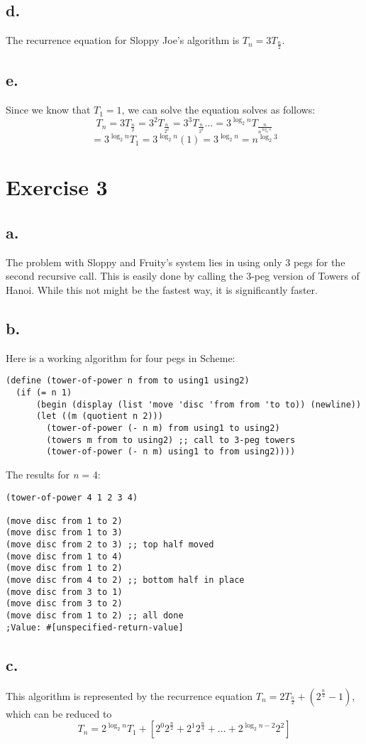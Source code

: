\documentclass[12pt]{article}
\begin{document}
\subsection*{d.}
The recurrence equation for Sloppy Joe's algorithm is $T_n = 3T_\frac{n}{2}.$
\subsection*{e.}
Since we know that $T_1 = 1$, we can solve the equation solves as follows:
$$
T_n = 3T_\frac{n}{2} = 3^2  T_\frac{n}{2^2} = 3^3  T_\frac{n}{2^3}
\ldots = 3^{\log_2 n}T_\frac{n}{n^{\log_2 n}}
$$
$$
 = 3^{\log_2 n}T_1 = 3^{\log_2 n}{(1)} =
3^{\log_2 n} = n^{\log_2 3}
$$
\section*{Exercise 3}
\subsection*{a.}
The problem with Sloppy and Fruity's system lies in using only 3 pegs for the second recursive call.
This is easily done by calling the 3-peg version of Towers of Hanoi. While this not might be the fastest
way, it is significantly faster.
\subsection*{b.}
Here is a working algorithm for four pegs in Scheme:
\begin{verbatim}
(define (tower-of-power n from to using1 using2)
  (if (= n 1)
      (begin (display (list 'move 'disc 'from from 'to to)) (newline))
      (let ((m (quotient n 2)))
        (tower-of-power (- n m) from using1 to using2)
        (towers m from to using2) ;; call to 3-peg towers
        (tower-of-power (- n m) using1 to from using2))))
\end{verbatim}
The results for \emph{n} = 4:
\begin{verbatim}
(tower-of-power 4 1 2 3 4)

(move disc from 1 to 2)
(move disc from 1 to 3)
(move disc from 2 to 3) ;; top half moved
(move disc from 1 to 4)
(move disc from 1 to 2)
(move disc from 4 to 2) ;; bottom half in place
(move disc from 3 to 1)
(move disc from 3 to 2)
(move disc from 1 to 2) ;; all done
;Value: #[unspecified-return-value]
\end{verbatim}

\subsection*{c.}
This algorithm is represented by the recurrence equation $T_n = 2T_\frac{n}{2} + (2^{\frac{n}{2}} - 1)$, which can be reduced to
$$
T_n = 2^{\log_2 n}T_1 + [2^0 2^\frac{n}{2} + 2^1 2^\frac{n}{4} + \ldots + 2^{{\log_2 n}-2} 2^2]
$$
\end{document}
